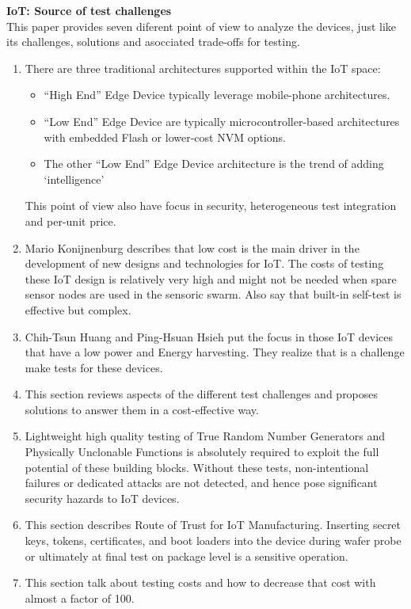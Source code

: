\textbf{IoT: Source of test challenges}\cite{Paper4}\\
This paper provides seven diferent point of view to analyze the \IoT devices, just like its challenges, solutions and asocciated trade-offs for testing.
\begin{enumerate}
	\item There are three traditional architectures supported within the IoT space:
	\begin{itemize}
		\item ``High End'' Edge Device typically leverage mobile-phone architectures.
		\item ``Low End'' Edge Device are typically microcontroller-based architectures with embedded Flash or lower-cost NVM options.
		\item The other ``Low End'' Edge Device architecture is the trend of adding `intelligence'
	\end{itemize}
	This point of view also have focus in security, heterogeneous test integration and per-unit price.
	
	\item Mario Konijnenburg describes that low cost is the main driver in the development of new designs and technologies for IoT. The costs of testing these IoT design is relatively very high and might not be needed when spare sensor nodes are used in the sensoric swarm. Also say that built-in self-test is effective but complex.
	
	\item  Chih-Tsun Huang and Ping-Hsuan Hsieh put the focus in those IoT devices that have a low power and Energy harvesting. They realize that is a challenge make tests for these devices.
	
	\item This section reviews aspects of the different test challenges and proposes solutions to answer them in a cost-effective way. 
	
	\item Lightweight high quality testing of True Random Number Generators and Physically Unclonable Functions is absolutely required to exploit the full potential of these building blocks. Without these tests, non-intentional failures or dedicated attacks are not detected, and hence pose significant security hazards to IoT devices.
	
	\item This section describes Route of Trust for IoT Manufacturing. Inserting secret keys, tokens, certificates, and boot loaders into the device during wafer probe or ultimately at final test on package level is a sensitive operation.
	
	\item This section talk about testing costs and how to decrease that cost with almost a factor of 100.\\
\end{enumerate}

